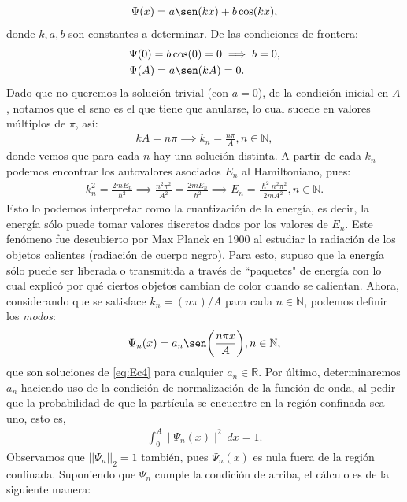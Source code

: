 \documentclass[12pt]{article}
\theoremstyle{definition}
\newcommand*{\field}[1]{\mathbb{#1}}
\begin{document}
\begin{align*}
    \Psi(x) = a\sen(kx) + b\cos(kx),
\end{align*}
donde $k,a,b$ son constantes a determinar. De las condiciones de frontera:
\begin{align*}
    & \Psi(0)=b\cos(0)=0 \implies b = 0,
    \\
    & \Psi(A) = a\sen(kA) = 0.
\end{align*}
Dado que no queremos la solución trivial (con $a = 0$), de la condición inicial en $A$, notamos que el seno es el que tiene que anularse, lo cual sucede en valores múltiplos de $\pi$, así:
\begin{align*}
    kA = n\pi \implies k_{n}=\frac{n\pi}{A}, n \in \field{N},
\end{align*}
\noindent
donde vemos que para cada $n$ hay una solución distinta.
A partir de cada $k_{n}$ podemos encontrar los autovalores asociados $E_{n}$ al Hamiltoniano, pues:
\begin{align}
    k_{n}^2=\frac{2mE_{n}}{\hslash^2}
    \implies
    \frac{n^2\pi^2}{A^2}=\frac{2mE_{n}}{\hslash^2} \implies E_{n} = \frac{\hslash^2n^2\pi^2}{2mA^2}, n \in \field{N}.
    \label{eq:Enecuant}
\end{align}
Esto lo podemos interpretar como la cuantización de la energía, es decir, la energía sólo puede tomar valores discretos dados por los valores de $E_{n}$. Este fenómeno fue descubierto por Max Planck en 1900 al estudiar la radiación de los objetos calientes (radiación de cuerpo negro). Para esto, supuso que la energía sólo puede ser liberada o transmitida a través de ``paquetes"\: de energía con lo cual explicó por qué ciertos objetos cambian de color cuando se calientan. 
Ahora, considerando que se satisface $k_{n} = (n\pi)/A$ para cada $n\in\field{N}$, podemos definir los \textit{modos}:
\begin{align*}
    \Psi_{n}(x) = a_{n}\sen\bigg(\frac{n\pi x}{A}\bigg), n\in\field{N},
\end{align*}
que son soluciones de \eqref{eq:Ec4} para cualquier $a_{n}\in\field{R}$.
Por último, determinaremos $a_{n}$ haciendo uso de la condición de normalización de la función de onda, al pedir que la probabilidad de que la partícula se encuentre en la región confinada sea uno, esto es,
\begin{align*}
    \int_{0}^{A} \mid\Psi_{n}(x)\mid^2\:dx=1.
\end{align*}
Observamos que $||\Psi_{n}||_{2} = 1$ también, pues $\Psi_{n}(x)$ es nula fuera de la región confinada.
Suponiendo que $\Psi_{n}$ cumple la condición de arriba, el cálculo es de la siguiente manera:
\end{document}

